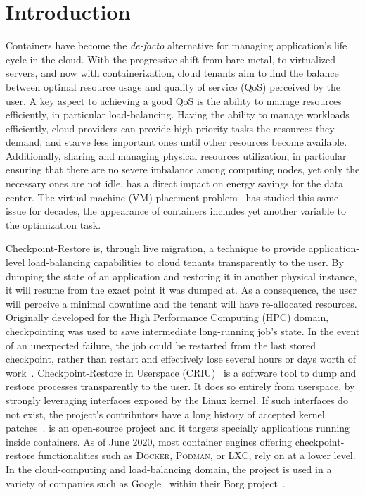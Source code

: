 \chapter{Introduction} \label{chap:introduction}

Containers have become the \textit{de-facto} alternative for managing application's life cycle in the cloud.
With the progressive shift from bare-metal, to virtualized servers, and now with containerization, cloud tenants aim to find the balance between optimal resource usage and quality of service (QoS) perceived by the user.
A key aspect to achieving a good QoS is the ability to manage resources efficiently, in particular load-balancing.
Having the ability to manage workloads efficiently, cloud providers can provide high-priority tasks the resources they demand, and starve less important ones until other resources become available.
Additionally, sharing and managing physical resources utilization, in particular ensuring that there are no severe imbalance among computing nodes, yet only the necessary ones are not idle, has a direct impact on energy savings for the data center.
The virtual machine (VM) placement problem~\cite{Masdari2016,Strunk2012} has studied this same issue for decades, the appearance of containers includes yet another variable to the optimization task. 

Checkpoint-Restore is, through live migration, a technique to provide application-level load-balancing capabilities to cloud tenants transparently to the user.
By dumping the state of an application and restoring it in another physical instance, it will resume from the exact point it was dumped at.
As a consequence, the user will perceive a minimal downtime and the tenant will have re-allocated resources.
Originally developed for the High Performance Computing (HPC) domain, checkpointing was used to save intermediate long-running job's state.
In the event of an unexpected failure, the job could be restarted from the last stored checkpoint, rather than restart and effectively lose several hours or days worth of work~\cite{Barker2014}.
Checkpoint-Restore in Userspace (CRIU)~\cite{criu-main-page} is a software tool to dump and restore processes transparently to the user.
It does so entirely from userspace, by strongly leveraging interfaces exposed by the Linux kernel.
If such interfaces do not exist, the project's contributors have a long history of accepted kernel patches~\cite{criu-kernel-patches}.
\criu is an open-source project and it targets specially applications running inside containers.
As of June 2020, most container engines offering checkpoint-restore functionalities such as \textsc{Docker}, \textsc{Podman}, or \textsc{LXC}, rely on \criu at a lower level.
In the cloud-computing and load-balancing domain, the project is used in a variety of companies such as Google~\cite{Tucker18} within their Borg project~\cite{Verma2015}.

